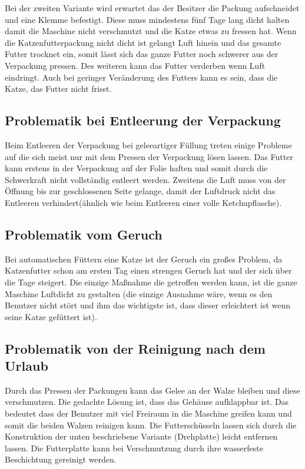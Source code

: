 Bei der zweiten Variante wird erwartet das der Besitzer die Packung aufschneidet und eine Klemme befestigt. Diese muss mindestens fünf Tage lang dicht halten damit die Maschine nicht verschmutzt und die Katze etwas zu fressen hat. Wenn die Katzenfutterpackung nicht dicht ist gelangt Luft hinein und das gesamte Futter trocknet ein, somit lässt sich das ganze Futter noch schwerer aus der Verpackung pressen. Des weiteren kann das Futter verderben wenn Luft eindringt. Auch bei geringer Veränderung des Futters kann es sein, dass die Katze, das Futter nicht frisst.

\subsection{Problematik bei Entleerung der Verpackung}

Beim Entleeren der Verpackung bei geleeartiger Füllung treten einige Probleme auf die sich meist nur mit dem Pressen der Verpackung lösen lassen. Das Futter kann erstens in der Verpackung auf der Folie haften und somit durch die Schwerkraft nicht vollständig entleert werden. Zweitens die Luft muss von der Öffnung bis zur geschlossenen Seite gelange, damit der Luftdruck nicht das Entleeren verhindert(ähnlich wie beim Entleeren einer volle Ketchupflasche). 

\subsection{Problematik vom Geruch}

Bei automatischen Füttern eine Katze ist der Geruch ein großes Problem, da Katzenfutter schon am ersten Tag einen strengen Geruch hat und der sich über die Tage steigert. Die einzige Maßnahme die getroffen werden kann, ist die ganze Maschine Luftdicht zu gestalten (die einzige Ausnahme wäre, wenn es den Benutzer nicht stört und ihm das wichtigste ist, dass dieser erleichtert ist wenn seine Katze gefüttert ist). 

\subsection{Problematik von der Reinigung nach dem Urlaub}

Durch das Pressen der Packungen kann das Gelee an der Walze bleiben und diese verschmutzen. Die gedachte Lösung ist, dass das Gehäuse aufklappbar ist. Das bedeutet dass der Benutzer mit viel Freiraum in die Maschine greifen kann und  somit die beiden Walzen reinigen kann. Die Futterschüsseln lassen sich durch die Konstruktion der unten beschriebene Variante (Drehplatte) leicht entfernen lassen. Die Futterplatte kann bei Verschmutzung durch ihre wasserfeste Beschichtung gereinigt werden.

